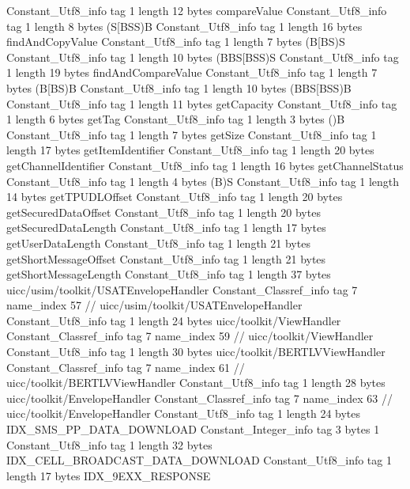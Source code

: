 {{{		}
		Constant_Utf8_info {
			tag	1
			length	12
			bytes	compareValue
		}
		Constant_Utf8_info {
			tag	1
			length	8
			bytes	(S[BSS)B
		}
		Constant_Utf8_info {
			tag	1
			length	16
			bytes	findAndCopyValue
		}
		Constant_Utf8_info {
			tag	1
			length	7
			bytes	(B[BS)S
		}
		Constant_Utf8_info {
			tag	1
			length	10
			bytes	(BBS[BSS)S
		}
		Constant_Utf8_info {
			tag	1
			length	19
			bytes	findAndCompareValue
		}
		Constant_Utf8_info {
			tag	1
			length	7
			bytes	(B[BS)B
		}
		Constant_Utf8_info {
			tag	1
			length	10
			bytes	(BBS[BSS)B
		}
		Constant_Utf8_info {
			tag	1
			length	11
			bytes	getCapacity
		}
		Constant_Utf8_info {
			tag	1
			length	6
			bytes	getTag
		}
		Constant_Utf8_info {
			tag	1
			length	3
			bytes	()B
		}
		Constant_Utf8_info {
			tag	1
			length	7
			bytes	getSize
		}
		Constant_Utf8_info {
			tag	1
			length	17
			bytes	getItemIdentifier
		}
		Constant_Utf8_info {
			tag	1
			length	20
			bytes	getChannelIdentifier
		}
		Constant_Utf8_info {
			tag	1
			length	16
			bytes	getChannelStatus
		}
		Constant_Utf8_info {
			tag	1
			length	4
			bytes	(B)S
		}
		Constant_Utf8_info {
			tag	1
			length	14
			bytes	getTPUDLOffset
		}
		Constant_Utf8_info {
			tag	1
			length	20
			bytes	getSecuredDataOffset
		}
		Constant_Utf8_info {
			tag	1
			length	20
			bytes	getSecuredDataLength
		}
		Constant_Utf8_info {
			tag	1
			length	17
			bytes	getUserDataLength
		}
		Constant_Utf8_info {
			tag	1
			length	21
			bytes	getShortMessageOffset
		}
		Constant_Utf8_info {
			tag	1
			length	21
			bytes	getShortMessageLength
		}
		Constant_Utf8_info {
			tag	1
			length	37
			bytes	uicc/usim/toolkit/USATEnvelopeHandler
		}
		Constant_Classref_info {
			tag	7
			name_index	57		// uicc/usim/toolkit/USATEnvelopeHandler
		}
		Constant_Utf8_info {
			tag	1
			length	24
			bytes	uicc/toolkit/ViewHandler
		}
		Constant_Classref_info {
			tag	7
			name_index	59		// uicc/toolkit/ViewHandler
		}
		Constant_Utf8_info {
			tag	1
			length	30
			bytes	uicc/toolkit/BERTLVViewHandler
		}
		Constant_Classref_info {
			tag	7
			name_index	61		// uicc/toolkit/BERTLVViewHandler
		}
		Constant_Utf8_info {
			tag	1
			length	28
			bytes	uicc/toolkit/EnvelopeHandler
		}
		Constant_Classref_info {
			tag	7
			name_index	63		// uicc/toolkit/EnvelopeHandler
		}
		Constant_Utf8_info {
			tag	1
			length	24
			bytes	IDX_SMS_PP_DATA_DOWNLOAD
		}
		Constant_Integer_info {
			tag	3
			bytes	1
		}
		Constant_Utf8_info {
			tag	1
			length	32
			bytes	IDX_CELL_BROADCAST_DATA_DOWNLOAD
		}
		Constant_Utf8_info {
			tag	1
			length	17
			bytes	IDX_9EXX_RESPONSE
		}
}}

